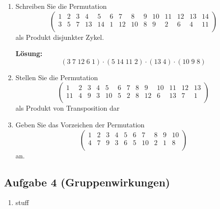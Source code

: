 \documentclass[11pt,a4paper,ngerman]{article}
\begin{document}
\begin{enumerate}[\bfseries a)]
\item Schreiben Sie die Permutation
$$
\left( \begin{array}{cccccccccccccc}
1 & 2 & 3 & 4 & 5 & 6 & 7 & 8 & 9 & 10 & 11 & 12 & 13 & 14  \\
3 & 5 & 7 & 13 & 14 & 1 & 12 & 10 & 8 & 9 & 2 & 6 & 4 & 11  \\
\end{array} \right)
$$
als Produkt disjunkter Zykel.

\textbf{Lösung:}\\
$$
(3 \; 7 \; 12 \; 6  \;1) \cdot (5 \;14 \;11\; 2) \cdot (13 \;4) \cdot (10\; 9\; 8)
$$


\item Stellen Sie die Permutation
$$
\left( \begin{array}{cccccccccccccc}
1 & 2 & 3 & 4 & 5 & 6 & 7 & 8 & 9 & 10 & 11 & 12 & 13  \\
11 & 4 & 9 & 3 & 10 & 5 & 2 & 8 & 12 & 6 & 13 & 7 & 1  \\
\end{array} \right)
$$
als Produkt von Transposition dar

\item Geben Sie das Vorzeichen der Permutation 
$$
\left( \begin{array}{cccccccccccccc}
1 & 2 & 3 & 4 & 5 & 6 & 7 & 8 & 9 & 10  \\
4 & 7 & 9 & 3 & 6 & 5 & 10 & 2 & 1 & 8  \\
\end{array} \right)
$$
an.

\end{enumerate}

\subsection*{Aufgabe 4 \mdseries (Gruppenwirkungen)}

\begin{enumerate}[\bfseries a)]
\item stuff
\end{enumerate}

\label{LastPage}
\end{document}
